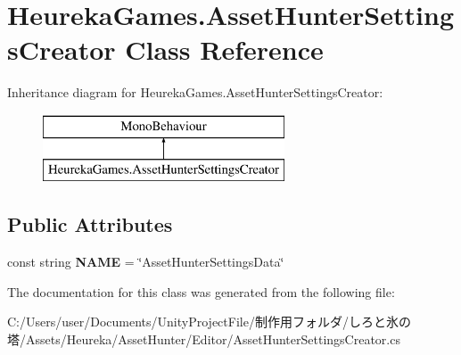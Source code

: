 \hypertarget{class_heureka_games_1_1_asset_hunter_settings_creator}{}\section{Heureka\+Games.\+Asset\+Hunter\+Settings\+Creator Class Reference}
\label{class_heureka_games_1_1_asset_hunter_settings_creator}
Inheritance diagram for Heureka\+Games.\+Asset\+Hunter\+Settings\+Creator\+:\begin{figure}[H]
\begin{center}
\leavevmode
\includegraphics[height=2.000000cm]{class_heureka_games_1_1_asset_hunter_settings_creator}
\end{center}
\end{figure}
\subsection*{Public Attributes}
\begin{DoxyCompactItemize}
\item 
\mbox{\label{class_heureka_games_1_1_asset_hunter_settings_creator_a61238ff166a4864c5aa0c39f53b947f6}} 
const string {\bfseries N\+A\+ME} = \char`\"{}Asset\+Hunter\+Settings\+Data\char`\"{}
\end{DoxyCompactItemize}


The documentation for this class was generated from the following file\+:\begin{DoxyCompactItemize}
\item 
C\+:/\+Users/user/\+Documents/\+Unity\+Project\+File/制作用フォルダ/しろと氷の塔/\+Assets/\+Heureka/\+Asset\+Hunter/\+Editor/Asset\+Hunter\+Settings\+Creator.\+cs\end{DoxyCompactItemize}

